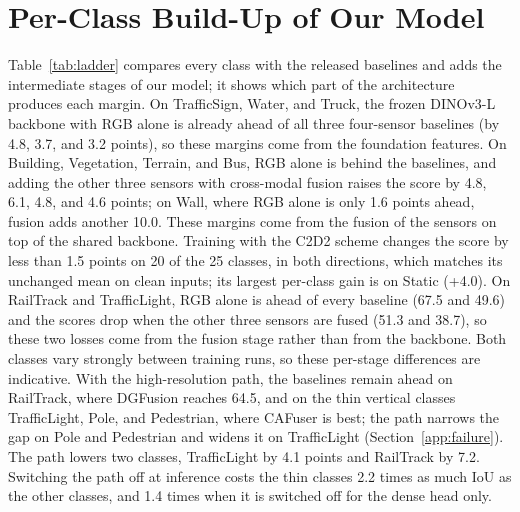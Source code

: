 \documentclass[10pt]{article}
\begin{document}
\section{Per-Class Build-Up of Our Model}
\label{app:ladder}
Table~\ref{tab:ladder} compares every class with the released baselines and adds the intermediate stages of our model; it shows which part of the architecture produces each margin. On TrafficSign, Water, and Truck, the frozen DINOv3-L backbone with RGB alone is already ahead of all three four-sensor baselines (by 4.8, 3.7, and 3.2 points), so these margins come from the foundation features. On Building, Vegetation, Terrain, and Bus, RGB alone is behind the baselines, and adding the other three sensors with cross-modal fusion raises the score by 4.8, 6.1, 4.8, and 4.6 points; on Wall, where RGB alone is only 1.6 points ahead, fusion adds another 10.0. These margins come from the fusion of the sensors on top of the shared backbone. Training with the C2D2 scheme changes the score by less than 1.5 points on 20 of the 25 classes, in both directions, which matches its unchanged mean on clean inputs; its largest per-class gain is on Static (+4.0). On RailTrack and TrafficLight, RGB alone is ahead of every baseline (67.5 and 49.6) and the scores drop when the other three sensors are fused (51.3 and 38.7), so these two losses come from the fusion stage rather than from the backbone. Both classes vary strongly between training runs, so these per-stage differences are indicative. With the high-resolution path, the baselines remain ahead on RailTrack, where DGFusion reaches 64.5, and on the thin vertical classes TrafficLight, Pole, and Pedestrian, where CAFuser is best; the path narrows the gap on Pole and Pedestrian and widens it on TrafficLight (Section~\ref{app:failure}). The path lowers two classes, TrafficLight by 4.1 points and RailTrack by 7.2. Switching the path off at inference costs the thin classes 2.2 times as much IoU as the other classes, and 1.4 times when it is switched off for the dense head only.
\end{document}
